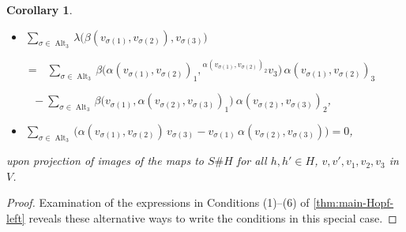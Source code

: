 \documentclass[11pt]{amsart}
\numberwithin{equation}{section}
\newtheorem{cor}[equation]{Corollary}
\DeclareMathOperator{\Alt}{Alt}
\renewcommand{\_}[1]{\mbox{$_{\left( #1 \right)}$}}
\newcommand{\Ho}{H}%
\begin{document}
{\begin{cor}
\begin{itemize}
   $ -\sum\sum_{\sigma\in\Alt_3}
  \alpha\big(v_{\sigma(1)},\alpha(v_{\sigma(2)},v_{\sigma(3)})_1\big) 
\ \alpha(v_{\sigma(2)},v_{\sigma(3)})_2$
\rule{0ex}{3ex}

$- \sum \sum_{\sigma\in\Alt_3} \alpha(v_{\sigma(1)},v_{\sigma(2)})_1\
\lambda\big(\alpha(v_{\sigma(1)},
   v_{\sigma(2)})_2, v_{\sigma(3)}\big)$
   \rule{0ex}{3ex}
   
   \hspace{-3ex}
   $= \sum_{\sigma\in\Alt_3} v_{\sigma(1)}\, \beta(v_{\sigma(2)},v_{\sigma(3)}) 
   - \sum\sum_{\sigma\in\Alt_3} {}^{\beta(v_{\sigma(1)},v_{\sigma(2)})_1}v_{\sigma(3)} 
     \ \beta(v_{\sigma(1)},v_{\sigma(2)})_2$,
     \rule{0ex}{3ex}
   \item[(5)] 
   $\sum_{\sigma\in\Alt_3} \lambda\big(\beta(v_{\sigma(1)},v_{\sigma(2)}) , v_{\sigma(3)}\big)$  
\rule{0ex}{3ex}

$ = \ \ \  \sum_{\sigma\in\Alt_3} \beta\big(
\alpha(v_{\sigma(1)},v_{\sigma(2)})_1, 
   {}^{\alpha(v_{\sigma(1)},v_{\sigma(2)})_2} v_3\big) 
\,  \alpha(v_{\sigma(1)}, v_{\sigma(2)})_3$
  \rule{0ex}{3ex}

$ \ \ \ - \sum_{\sigma\in\Alt_3} \beta\big(v_{\sigma(1)}, \alpha(v_{\sigma(2)},v_{\sigma(3)})_1\big)
    \ \alpha(v_{\sigma(2)},v_{\sigma(3)})_2$,
    \rule{0ex}{3ex}
  \item[(6)]
   $\sum_{\sigma\in\Alt_3} \big(\alpha(v_{\sigma(1)},v_{\sigma(2)})\, v_{\sigma(3)} 
   - v_{\sigma(1)}\, \alpha(v_{\sigma(2)},v_{\sigma(3)}) \big) = 0$,
   \rule{0ex}{3ex}
\end{itemize}
upon projection of images of the maps to $S\# \Ho$
for all $h, h'\in \Ho$, $v,v', v_1, v_2, v_3$ in $V$. 
\end{cor}


\begin{proof}
Examination of the expressions in Conditions (1)--(6) of
\cref{thm:main-Hopf-left} reveals these alternative 
ways to write the conditions in this special case.
\end{proof}









}
\end{document}

